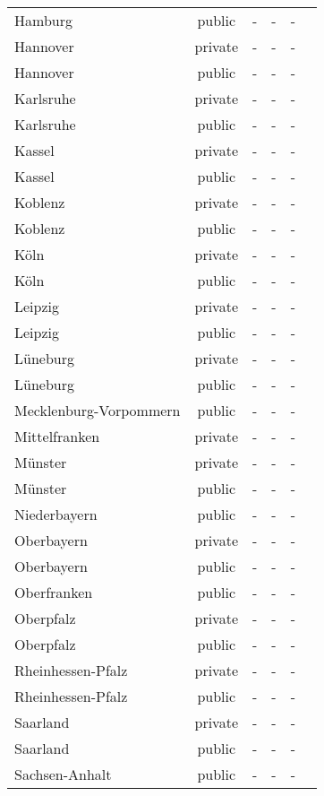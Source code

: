 \begin{table}[H]
\begin{tabularx}{\textwidth}{Xccccc}
            Hamburg & public & - & - & - \\
            Hannover & private & - & - & - \\
            Hannover & public & - & - & - \\
            Karlsruhe & private & - & - & - \\
            Karlsruhe & public & - & - & - \\
            Kassel & private & - & - & - \\
            Kassel & public & - & - & - \\
            Koblenz & private & - & - & - \\
            Koblenz & public & - & - & - \\
            Köln & private & - & - & - \\
            Köln & public & - & - & - \\
            Leipzig & private & - & - & - \\
            Leipzig & public & - & - & - \\
            Lüneburg & private & - & - & - \\
            Lüneburg & public & - & - & - \\
            Mecklenburg-Vorpommern & public & - & - & - \\
            Mittelfranken & private & - & - & - \\
            Münster & private & - & - & - \\
            Münster & public & - & - & - \\
            Niederbayern & public & - & - & - \\
            Oberbayern & private & - & - & - \\
            Oberbayern & public & - & - & - \\
            Oberfranken & public & - & - & - \\
            Oberpfalz & private & - & - & - \\
            Oberpfalz & public & - & - & - \\
            Rheinhessen-Pfalz & private & - & - & - \\
            Rheinhessen-Pfalz & public & - & - & - \\
            Saarland & private & - & - & - \\
            Saarland & public & - & - & - \\
            Sachsen-Anhalt & public & - & - & - \\

\end{tabularx}
\end{table}
